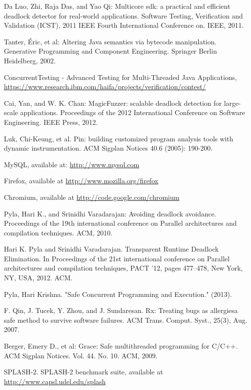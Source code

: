 \begin{thebibliography}{4}
 Da Luo, Zhi, Raja Das, and Yao Qi: Multicore sdk: a practical and efficient deadlock detector for real-world applications.
Software Testing, Verification and Validation (ICST), 2011 IEEE Fourth International Conference on. IEEE, 2011.

 Tanter, Éric, et al: Altering Java semantics via bytecode manipulation.
Generative Programming and Component Engineering. Springer Berlin Heidelberg, 2002.

 ConcurrentTesting - Advanced Testing for Multi-Threaded Java Applications, \url{https://www.research.ibm.com/haifa/projects/verification/contest/}

 Cai, Yan, and W. K. Chan: MagicFuzzer: scalable deadlock detection for large-scale applications.
Proceedings of the 2012 International Conference on Software Engineering. IEEE Press, 2012.

 Luk, Chi-Keung, et al. Pin: building customized program analysis tools with dynamic instrumentation.
ACM Sigplan Notices 40.6 (2005): 190-200.

 MySQL, available at: \url{http://www.mysql.com}

 Firefox, available at \url{http://www.mozilla.org/firefox}

 Chromium, available at \url{http://code.google.com/chromium}

 Pyla, Hari K., and Srinidhi Varadarajan: Avoiding deadlock avoidance.
Proceedings of the 19th international conference on Parallel architectures and compilation techniques. ACM, 2010.

 Hari K. Pyla and Srinidhi Varadarajan. Transparent Runtime Deadlock Elimination. In
Proceedings of the 21st international conference on Parallel architectures and compilation
techniques, PACT ’12, pages 477–478, New York, NY, USA, 2012. ACM.

 Pyla, Hari Krishna. "Safe Concurrent Programming and Execution." (2013).

 F. Qin, J. Tucek, Y. Zhou, and J. Sundaresan. Rx: Treating bugs as
allergiesa safe method to survive software failures. ACM Trans. Comput.
Syst., 25(3), Aug. 2007.

 Berger, Emery D., et al: Grace: Safe multithreaded programming for C/C++.
ACM Sigplan Notices. Vol. 44. No. 10. ACM, 2009.

 SPLASH-2. SPLASH-2 benchmark suite, available at \url{http://www.capsl.udel.edu/splash}


\end{thebibliography}
